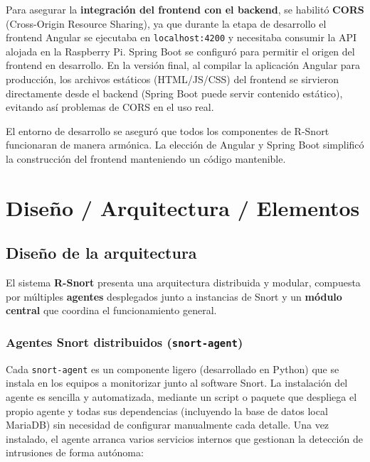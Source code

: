 \documentclass[11pt,a4paper,twoside]{report}
\begin{document}
Para asegurar la \textbf{integración del frontend con el backend}, se habilitó \textbf{CORS} (Cross-Origin Resource Sharing), ya que durante la etapa de desarrollo el frontend Angular se ejecutaba en \texttt{localhost:4200} y necesitaba consumir la API alojada en la Raspberry Pi. Spring Boot se configuró para permitir el origen del frontend en desarrollo. En la versión final, al compilar la aplicación Angular para producción, los archivos estáticos (HTML/JS/CSS) del frontend se sirvieron directamente desde el backend (Spring Boot puede servir contenido estático), evitando así problemas de CORS en el uso real.\newline

El entorno de desarrollo se aseguró que todos los componentes de R-Snort funcionaran de manera armónica. La elección de Angular y Spring Boot simplificó la construcción del frontend manteniendo un código mantenible.

\section{Diseño / Arquitectura / Elementos}

\subsection{Diseño de la arquitectura}

El sistema \textbf{R-Snort} presenta una arquitectura distribuida y modular, compuesta por múltiples \textbf{agentes} desplegados junto a instancias de Snort y un \textbf{módulo central} que coordina el funcionamiento general.

\subsubsection{Agentes Snort distribuidos (\texttt{snort-agent})}

Cada \texttt{snort-agent} es un componente ligero (desarrollado en Python) que se instala en los equipos a monitorizar junto al software Snort. La instalación del agente es sencilla y automatizada, mediante un script o paquete que despliega el propio agente y todas sus dependencias (incluyendo la base de datos local MariaDB) sin necesidad de configurar manualmente cada detalle. Una vez instalado, el agente arranca varios servicios internos que gestionan la detección de intrusiones de forma autónoma:
\end{document}
